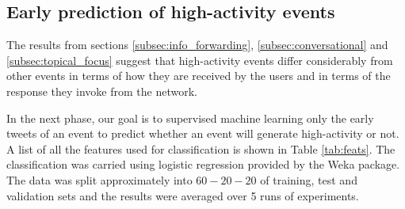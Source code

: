 \subsection{Early prediction of high-activity events}
\label{subsec:classification}
The results from sections \ref{subsec:info_forwarding}, \ref{subsec:conversational} and \ref{subsec:topical_focus} suggest that high-activity events differ
considerably from other events in terms of how they are received by the users
and in terms of the response they invoke from the network.

In the next phase, our goal is to supervised machine learning only the
early tweets of an event to predict whether an event will generate high-activity or not. 
A list of all the features used for classification is shown in Table \ref{tab:feats}.
The classification was carried using logistic regression provided by the Weka package.
The data was split approximately into $60-20-20$ of training, test and validation sets
and the results were averaged over 5 runs of experiments.

